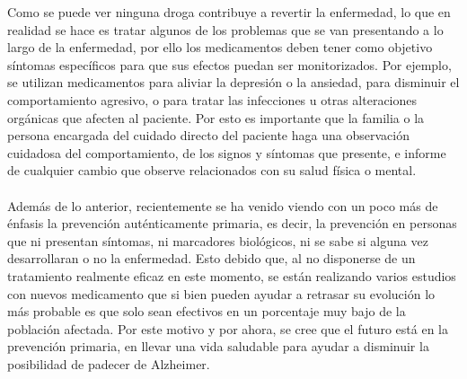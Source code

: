 \documentclass[smallextended, 12pt]{article}
\begin{document}
	Como se puede ver ninguna droga contribuye a revertir la enfermedad, lo que en realidad se hace es tratar algunos de los problemas que se van presentando a lo largo de la enfermedad, por ello los medicamentos deben tener como objetivo s\'intomas espec\'ificos para que sus efectos puedan ser monitorizados. Por ejemplo, se utilizan medicamentos para aliviar la depresi\'on o la ansiedad, para disminuir el comportamiento agresivo, o para tratar las infecciones u otras alteraciones org\'anicas que afecten al paciente. Por esto es importante que la familia o la persona encargada del cuidado directo del paciente haga una observaci\'on cuidadosa del comportamiento, de los signos y s\'intomas que presente, e informe de cualquier cambio que observe relacionados con su salud f\'isica o mental. \cite{ref8}\\
	\\
	Adem\'as de lo anterior, recientemente se ha venido viendo con un poco m\'as de \'enfasis la prevenci\'on aut\'enticamente primaria, es decir, la prevenci\'on en personas que ni presentan s\'intomas, ni marcadores biol\'ogicos, ni se sabe si alguna vez desarrollaran o no la enfermedad.  Esto debido que, al no disponerse de un tratamiento realmente eficaz en este momento, se est\'an realizando varios estudios con nuevos medicamento que si bien pueden ayudar a retrasar su evoluci\'on lo m\'as probable es que solo sean efectivos en un porcentaje muy bajo de la poblaci\'on afectada. Por este motivo y por ahora, se cree que el futuro est\'a en la prevenci\'on primaria, en llevar una vida saludable para ayudar a disminuir la posibilidad de padecer de Alzheimer.\cite{ref10}
	
\end{document}
